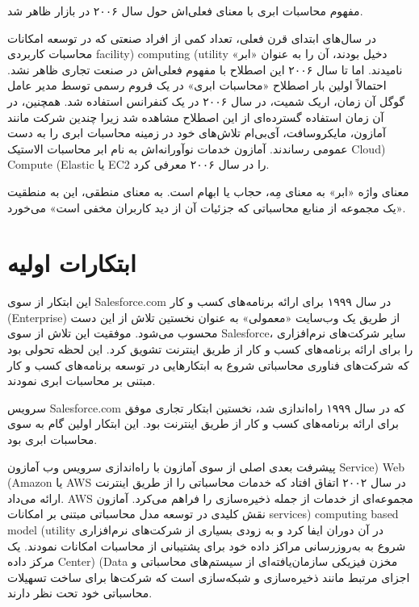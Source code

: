 \documentclass{book}
\begin{document}
            \begin{addinfo}
                
                مفهوم محاسبات ابری با معنای فعلی‌اش حول سال ۲۰۰۶ در بازار ظاهر شد.
                
            \end{addinfo}

            در سال‌های ابتدای قرن فعلی، تعداد کمی از افراد صنعتی که در توسعه امکانات محاسبات کاربردی facility) computing (utility  دخیل بودند، آن را به عنوان «ابر» نامیدند. اما تا سال ۲۰۰۶ این اصطلاح با مفهوم فعلی‌اش در صنعت تجاری ظاهر نشد. احتمالاً اولین بار اصطلاح «محاسبات ابری» در یک فروم رسمی توسط مدیر عامل گوگل آن زمان، اریک شمیت، در سال ۲۰۰۶ در یک کنفرانس استفاده شد. همچنین، در آن زمان استفاده گسترده‌ای از این اصطلاح مشاهده شد زیرا چندین شرکت مانند آمازون، مایکروسافت، آی‌بی‌ام تلاش‌های خود در زمینه محاسبات ابری را به دست عمومی رساندند. آمازون خدمات نوآورانه‌اش به نام ابر محاسبات الاستیک Cloud) Compute (Elastic یا EC2 را در سال ۲۰۰۶ معرفی کرد.

            معنای واژه «ابر» به معنای مِه، حجاب یا ابهام است. به معنای منطقی، این به منطقیت «یک مجموعه از منابع محاسباتی که جزئیات آن از دید کاربران مخفی است» می‌خورد.


        \section{ابتکارات اولیه}

            این ابتکار از سوی Salesforce.com در سال ۱۹۹۹ برای ارائه برنامه‌های کسب و کار (Enterprise) از طریق یک وب‌سایت «معمولی» به عنوان نخستین تلاش از این دست محسوب می‌شود. موفقیت این تلاش از سوی Salesforce، سایر شرکت‌های نرم‌افزاری را برای ارائه برنامه‌های کسب و کار از طریق اینترنت تشویق کرد. این لحظه تحولی بود که شرکت‌های فناوری محاسباتی شروع به ابتکار‌هایی در توسعه برنامه‌های کسب و کار مبتنی بر محاسبات ابری نمودند.

            \begin{addinfo}
                
                سرویس Salesforce.com که در سال ۱۹۹۹ راه‌اندازی شد، نخستین ابتکار تجاری موفق برای ارائه برنامه‌های کسب و کار از طریق اینترنت بود. این ابتکار اولین گام به سوی محاسبات ابری بود.

            \end{addinfo}

            پیشرفت بعدی اصلی از سوی آمازون با راه‌اندازی سرویس وب آمازون Service) Web (Amazon یا AWS در سال ۲۰۰۲ اتفاق افتاد که خدمات محاسباتی را از طریق اینترنت ارائه می‌داد. AWS مجموعه‌ای از خدمات از جمله ذخیره‌سازی را فراهم می‌کرد. آمازون نقش کلیدی در توسعه مدل محاسباتی مبتنی بر امکانات services) computing based model (utility در آن دوران ایفا کرد و به زودی بسیاری از شرکت‌های نرم‌افزاری شروع به به‌روزرسانی مراکز داده خود برای پشتیبانی از محاسبات امکانات نمودند. یک مرکز داده Center) (Data مخزن فیزیکی سازمان‌یافته‌ای از سیستم‌های محاسباتی و اجزای مرتبط مانند ذخیره‌سازی و شبکه‌سازی است که شرکت‌ها برای ساخت تسهیلات محاسباتی خود تحت نظر دارند.
\end{document}

